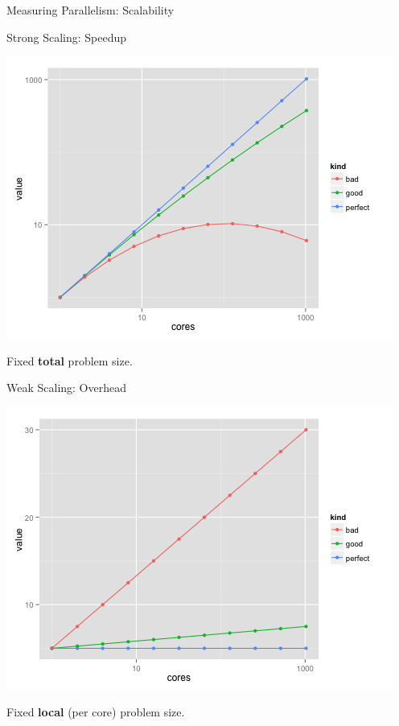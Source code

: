 \begin{frame}{Measuring Parallelism: Scalability}
  \begin{center}
    \begin{minipage}{.475\textwidth}
      \begin{block}{Strong Scaling: Speedup}
        \begin{center}
          \includegraphics[width=.95\textwidth]{../common/pics/scaling/scaling_strong}
        \end{center}
        Fixed \textbf{total} problem size.
      \end{block}
    \end{minipage}
    \hspace{.1cm}
    \begin{minipage}{.475\textwidth}
      \begin{block}{Weak Scaling: Overhead}
        \begin{center}
          \includegraphics[width=.95\textwidth]{../common/pics/scaling/scaling_weak}
        \end{center}
        Fixed \textbf{local} (per core) problem size.
      \end{block}
    \end{minipage}
  \end{center}
\end{frame}



